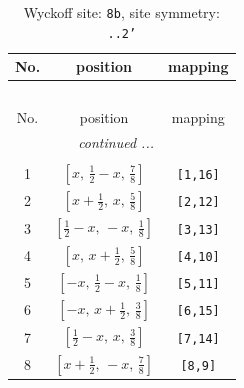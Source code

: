 \documentclass[fleqn,8pt]{jsarticle}
\begin{document}
\begin{longtable}{ccc}
\caption{Wyckoff site: {\tt 8b}, site symmetry: {\tt ..2'}}
 \\
 \hline \hline
No. & position & mapping \\ \hline \endfirsthead

\multicolumn{2}{l}{\tablename\ \thetable{}} \\
 \hline \hline
No. & position & mapping \\ \hline \endhead

 \hline \hline
\multicolumn{2}{r}{\footnotesize\it continued ...} \\ \endfoot

 \hline \hline
\multicolumn{2}{r}{} \\ \endlastfoot

1 & $\left[ x,\, \frac{1}{2} - x,\, \frac{7}{8} \right]$ & {\tt [1,16]} \\ \hline
2 & $\left[ x + \frac{1}{2},\, x,\, \frac{5}{8} \right]$ & {\tt [2,12]} \\ \hline
3 & $\left[ \frac{1}{2} - x,\, - x,\, \frac{1}{8} \right]$ & {\tt [3,13]} \\ \hline
4 & $\left[ x,\, x + \frac{1}{2},\, \frac{5}{8} \right]$ & {\tt [4,10]} \\ \hline
5 & $\left[ - x,\, \frac{1}{2} - x,\, \frac{1}{8} \right]$ & {\tt [5,11]} \\ \hline
6 & $\left[ - x,\, x + \frac{1}{2},\, \frac{3}{8} \right]$ & {\tt [6,15]} \\ \hline
7 & $\left[ \frac{1}{2} - x,\, x,\, \frac{3}{8} \right]$ & {\tt [7,14]} \\ \hline
8 & $\left[ x + \frac{1}{2},\, - x,\, \frac{7}{8} \right]$ & {\tt [8,9]} \\
\end{longtable}
\renewcommand{\arraystretch}{1.2}
\end{document}
